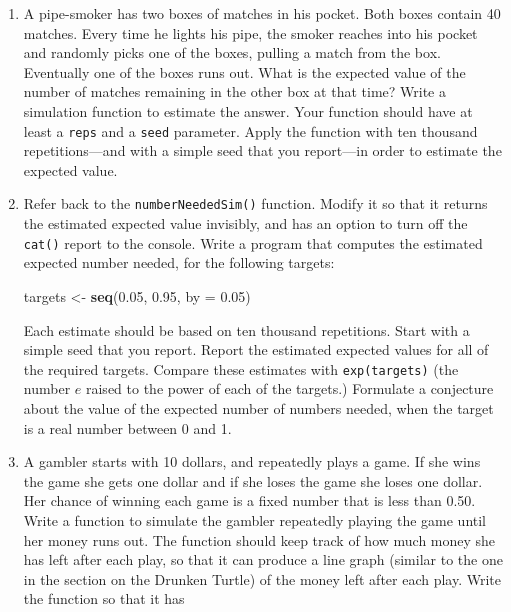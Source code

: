 \documentclass[]{book}
\makeatletter
\newenvironment{Shaded}{\begin{snugshade}}{\end{snugshade}}
\newcommand{\KeywordTok}[1]{\textcolor[rgb]{0.13,0.29,0.53}{\textbf{{#1}}}}
\newcommand{\DataTypeTok}[1]{\textcolor[rgb]{0.13,0.29,0.53}{{#1}}}
\newcommand{\FloatTok}[1]{\textcolor[rgb]{0.00,0.00,0.81}{{#1}}}
\newcommand{\StringTok}[1]{\textcolor[rgb]{0.31,0.60,0.02}{{#1}}}
\newcommand{\NormalTok}[1]{{#1}}
\newenvironment{kframe}{%
\medskip{}
\setlength{\fboxsep}{.8em}
 \def\at@end@of@kframe{}%
 \ifinner\ifhmode%
  \def\at@end@of@kframe{\end{minipage}}%
  \begin{minipage}{\columnwidth}%
 \fi\fi%
 \def\FrameCommand##1{\hskip\@totalleftmargin \hskip-\fboxsep
 \colorbox{shadecolor}{##1}\hskip-\fboxsep
     \hskip-\linewidth \hskip-\@totalleftmargin \hskip\columnwidth}%
 \MakeFramed {\advance\hsize-\width
   \@totalleftmargin\z@ \linewidth\hsize
   \@setminipage}}%
 {\par\unskip\endMakeFramed%
 \at@end@of@kframe}
\renewenvironment{Shaded}{\begin{kframe}}{\end{kframe}}
\theoremstyle{definition}
\theoremstyle{definition}
\theoremstyle{remark}
\makeatother
\begin{document}
{\begin{enumerate}
  Apply the function with ten thousand repetitions (and a simple seed
  that you report) in order to estimate the probability of a meeting,
  assuming that Anna is willing to wait 13 minutes and Raj is willing to
  wait 7 minutes.
\item
  A pipe-smoker has two boxes of matches in his pocket. Both boxes
  contain 40 matches. Every time he lights his pipe, the smoker reaches
  into his pocket and randomly picks one of the boxes, pulling a match
  from the box. Eventually one of the boxes runs out. What is the
  expected value of the number of matches remaining in the other box at
  that time? Write a simulation function to estimate the answer. Your
  function should have at least a \texttt{reps} and a \texttt{seed}
  parameter. Apply the function with ten thousand repetitions---and with
  a simple seed that you report---in order to estimate the expected
  value.
\item
  Refer back to the \texttt{numberNeededSim()} function. Modify it so
  that it returns the estimated expected value invisibly, and has an
  option to turn off the \texttt{cat()} report to the console. Write a
  program that computes the estimated expected number needed, for the
  following targets:

\begin{Shaded}
\begin{Highlighting}[]
\NormalTok{targets <-}\StringTok{ }\KeywordTok{seq}\NormalTok{(}\FloatTok{0.05}\NormalTok{, }\FloatTok{0.95}\NormalTok{, }\DataTypeTok{by =} \FloatTok{0.05}\NormalTok{)}
\end{Highlighting}
\end{Shaded}

  Each estimate should be based on ten thousand repetitions. Start with
  a simple seed that you report. Report the estimated expected values
  for all of the required targets. Compare these estimates with
  \texttt{exp(targets)} (the number \(e\) raised to the power of each of
  the targets.) Formulate a conjecture about the value of the expected
  number of numbers needed, when the target is a real number between 0
  and 1.
\item
  A gambler starts with 10 dollars, and repeatedly plays a game. If she
  wins the game she gets one dollar and if she loses the game she loses
  one dollar. Her chance of winning each game is a fixed number that is
  less than 0.50. Write a function to simulate the gambler repeatedly
  playing the game until her money runs out. The function should keep
  track of how much money she has left after each play, so that it can
  produce a line graph (similar to the one in the section on the Drunken
  Turtle) of the money left after each play. Write the function so that
  it has


\end{enumerate}}
\end{document}
